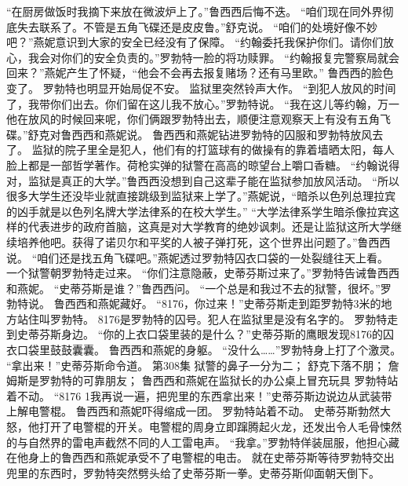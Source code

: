 \documentclass[a4paper,12pt,UTF8,twoside]{ctexbook}
\begin{document}
        “在厨房做饭时我摘下来放在微波炉上了。”鲁西西后悔不迭。  
        “咱们现在同外界彻底失去联系了。不管是五角飞碟还是皮皮鲁。”舒克说。  
        “咱们的处境好像不妙吧？”燕妮意识到大家的安全已经没有了保障。  
        “约翰委托我保护你们。请你们放心，我会对你们的安全负责的。”罗勃特一脸的将功赎罪。  
        “约翰报复完警察局就会回来？”燕妮产生了怀疑，“他会不会再去报复赌场？还有马里欧。”  
        鲁西西的脸色变了。  
        罗勃特也明显开始局促不安。  
        监狱里突然铃声大作。  
        “到犯人放风的时间了，我带你们出去。你们留在这儿我不放心。”罗勃特说。  
        “我在这儿等约翰，万一他在放风的时候回来呢，你们俩跟罗勃特出去，顺便注意观察天上有没有五角飞碟。”舒克对鲁西西和燕妮说。  
        鲁西西和燕妮钻进罗勃特的囚服和罗勃特放风去了。        
        监狱的院子里全是犯人，他们有的打篮球有的做操有的靠着墙晒太阳，每人脸上都是一部哲学著作。荷枪实弹的狱警在高高的晾望台上嚼口香糖。  
        “约翰说得对，监狱是真正的大学。”鲁西西没想到自己这辈子能在监狱参加放风活动。  
        “所以很多大学生还没毕业就直接跳级到监狱来上学了。”燕妮说，“暗杀以色列总理拉宾的凶手就是以色列名牌大学法律系的在校大学生。”  
        “大学法律系学生暗杀像拉宾这样的代表进步的政府首脑，这真是对大学教育的绝妙讽刺。还是让监狱这所大学继续培养他吧。获得了诺贝尔和平奖的人被子弹打死，这个世界出问题了。”鲁西西说。  
        “咱们还是找五角飞碟吧。”燕妮透过罗勃特囚衣口袋的一处裂缝往天上看。  
        一个狱警朝罗勃特走过来。  
        “你们注意隐蔽，史蒂芬斯过来了。”罗勃特告诫鲁西西和燕妮。  
        “史蒂芬斯是谁？”鲁西西问。  
        “一个总是和我过不去的狱警，很坏。”罗勃特说。  
        鲁西西和燕妮藏好。  
        “8176，你过来！”史蒂芬斯走到距罗勃特3米的地方站住叫罗勃特。  
        8176是罗勃特的囚号。犯人在监狱里是没有名字的。  
        罗勃特走到史蒂芬斯身边。  
        “你的上衣口袋里装的是什么？”史蒂芬斯的鹰眼发现8176的囚衣口袋里鼓鼓囊囊。  
        鲁西西和燕妮的身躯。  
        “没什么……”罗勃特身上打了个激灵。  
        “拿出来！”史蒂芬斯命令道。          第308集  
        狱警的鼻子一分为二；  
        舒克下落不朋；  
        詹姆斯是罗勃特的可靠朋友；  
        鲁西西和燕妮在监狱长的办公桌上冒充玩具    
        罗勃特站着不动。  
        “8176 1我再说一遍，把兜里的东西拿出来！”史蒂芬斯边说边从武装带上解电警棍。  
        鲁西西和燕妮吓得缩成一团。  
        罗勃特站着不动。  
        史蒂芬斯勃然大怒，他打开了电警棍的开关。电警棍的周身立即蹿腾起火龙，还发出令人毛骨悚然的与自然界的雷电声截然不同的人工雷电声。  
        “我拿。”罗勃特佯装屈服，他担心藏在他身上的鲁西西和燕妮承受不了电警棍的电击。        
        就在史蒂芬斯等待罗勃特交出兜里的东西时，罗勃特突然劈头给了史蒂芬斯一拳。史蒂芬斯仰面朝天倒下。  
\end{document}
